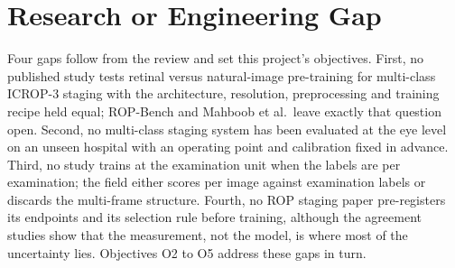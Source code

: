 \section{Research or Engineering Gap}
Four gaps follow from the review and set this project's objectives. First, no published study tests retinal versus natural-image pre-training for multi-class ICROP-3 staging with the architecture, resolution, preprocessing and training recipe held equal; ROP-Bench and Mahboob et al.\ leave exactly that question open. Second, no multi-class staging system has been evaluated at the eye level on an unseen hospital with an operating point and calibration fixed in advance. Third, no study trains at the examination unit when the labels are per examination; the field either scores per image against examination labels or discards the multi-frame structure. Fourth, no ROP staging paper pre-registers its endpoints and its selection rule before training, although the agreement studies show that the measurement, not the model, is where most of the uncertainty lies. Objectives O2 to O5 address these gaps in turn.
